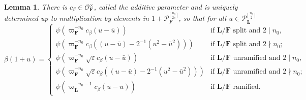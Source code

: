 \documentclass[A4]{amsart}
\newtheorem{lemma}      [theorem]{Lemma}
\numberwithin{equation}{section} \everymath{\displaystyle}
\newcommand{\F}{\mathbf{F}}
\newcommand{\bL}{\mathbf{L}}
\newcommand{\vO}{\mathcal{O}}
\newcommand{\vP}{\mathcal{P}}
\begin{document}
\begin{lemma} \label{lem: AddParMultChar}
	There is $c_{\beta} \in \vO_{\F}^{\times}$, called the \emph{additive parameter} and is uniquely determined up to multiplication by elements in $1+\vP_{\F}^{\lceil \frac{n_0}{2e} \rceil}$, so that for all $u \in \vP_{\bL}^{\lfloor \frac{n_0}{2} \rfloor}$
	$$ \beta(1+u) = \begin{cases}
		\psi \left( \varpi_{\F}^{-n_0} c_{\beta} (u-\bar{u}) \right) & \text{if } \bL/\F \text{ split and } 2 \mid n_0, \\
		\psi \left( \varpi_{\F}^{-n_0} c_{\beta} \left( (u-\bar{u}) - 2^{-1}(u^2-\bar{u}^2) \right) \right) & \text{if } \bL/\F \text{ split and } 2 \nmid n_0; \\
		\psi \left( \varpi_{\F}^{-n_0} \sqrt{\varepsilon} c_{\beta} (u-\bar{u}) \right) & \text{if } \bL/\F \text{ unramified and } 2 \mid n_0, \\
		\psi \left( \varpi_{\F}^{-n_0} \sqrt{\varepsilon} c_{\beta} \left( (u-\bar{u}) - 2^{-1}(u^2-\bar{u}^2) \right) \right) & \text{if } \bL/\F \text{ unramified and } 2 \nmid n_0; \\
		\psi \left( \varpi_{\bL}^{-n_0-1} c_{\beta} (u-\bar{u}) \right) & \text{if } \bL/\F \text{ ramified}.
	\end{cases} $$
\end{lemma}
\end{document}
